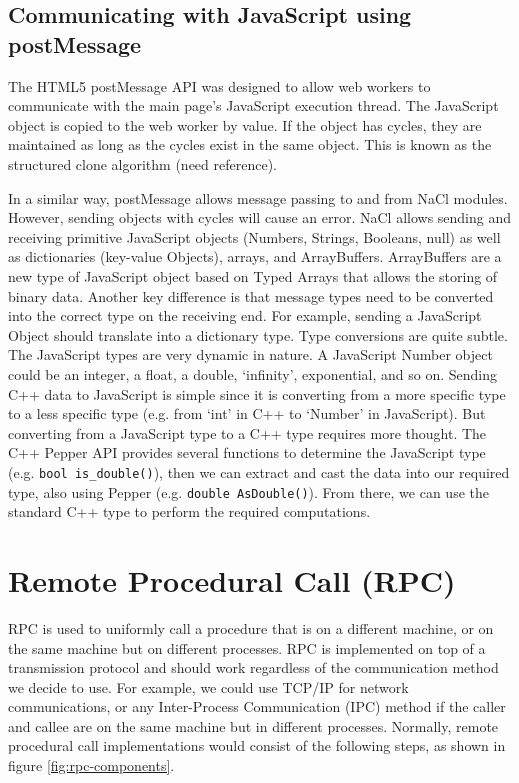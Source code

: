 \subsection{Communicating with JavaScript using postMessage}
The HTML5 postMessage API was designed to allow web workers to communicate with the main page's JavaScript execution thread. The JavaScript object is copied to the web worker by value. If the object has cycles, they are maintained as long as the cycles exist in the same object. This is known as the structured clone algorithm (need reference). 

In a similar way, postMessage allows message passing to and from NaCl modules. However, sending objects with cycles will cause an error. NaCl allows sending and receiving primitive JavaScript objects (Numbers, Strings, Booleans, null) as well as dictionaries (key-value Objects), arrays, and ArrayBuffers. ArrayBuffers are a new type of JavaScript object based on Typed Arrays \cite{typedarraysw3c} that allows the storing of binary data. Another key difference is that message types need to be converted into the correct type on the receiving end. For example, sending a JavaScript Object should translate into a dictionary type. Type conversions are quite subtle. The JavaScript types are very dynamic in nature. A JavaScript Number object could be an integer, a float, a double, `infinity', exponential, and so on. Sending C++ data to JavaScript is simple since it is converting from a more specific type to a less specific type (e.g. from `int' in C++ to `Number' in JavaScript). But converting from a JavaScript type to a C++ type requires more thought. The C++ Pepper API provides several functions to determine the JavaScript type (e.g. \verb+bool is_double()+), then we can extract and cast the data into our required type, also using Pepper (e.g. \verb+double AsDouble()+). From there, we can use the standard C++ type to perform the required computations.


\section{Remote Procedural Call (RPC)}
\label{RPCBackgroundSection} 
RPC is used to uniformly call a procedure that is on a different machine, or on the same machine but on different processes. RPC is implemented on top of a transmission protocol and should work regardless of the communication method we decide to use. For example, we could use TCP/IP for network communications, or any Inter-Process Communication (IPC) method if the caller and callee are on the same machine but in different processes. Normally, remote procedural call implementations would consist of the following steps, as shown in figure \ref{fig:rpc-components}.

